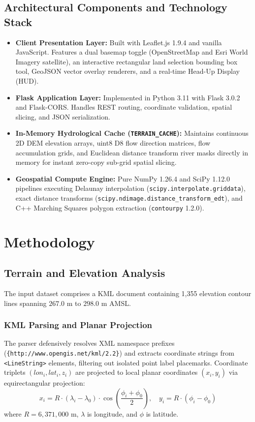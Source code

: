 \documentclass[manuscript,screen,review]{acmart}
\begin{document}
\subsection{Architectural Components and Technology Stack}
\begin{itemize}
    \item \textbf{Client Presentation Layer:} Built with Leaflet.js 1.9.4 and vanilla JavaScript. Features a dual basemap toggle (OpenStreetMap and Esri World Imagery satellite), an interactive rectangular land selection bounding box tool, GeoJSON vector overlay renderers, and a real-time Head-Up Display (HUD).
    \item \textbf{Flask Application Layer:} Implemented in Python 3.11 with Flask 3.0.2 and Flask-CORS. Handles REST routing, coordinate validation, spatial slicing, and JSON serialization.
    \item \textbf{In-Memory Hydrological Cache (\texttt{TERRAIN\_CACHE}):} Maintains continuous 2D DEM elevation arrays, uint8 D8 flow direction matrices, flow accumulation grids, and Euclidean distance transform river masks directly in memory for instant zero-copy sub-grid spatial slicing.
    \item \textbf{Geospatial Compute Engine:} Pure NumPy 1.26.4 and SciPy 1.12.0 pipelines executing Delaunay interpolation (\texttt{scipy.interpolate.griddata}), exact distance transforms (\texttt{scipy.ndimage.distance\_transform\_edt}), and C++ Marching Squares polygon extraction (\texttt{contourpy} 1.2.0).
\end{itemize}

\section{Methodology}
\label{sec:methodology}

\subsection{Terrain and Elevation Analysis}
The input dataset comprises a KML document containing 1,355 elevation contour lines spanning $267.0\text{ m}$ to $298.0\text{ m}$ AMSL.

\subsubsection{KML Parsing and Planar Projection}
The parser defensively resolves XML namespace prefixes (\texttt{\{http://www.opengis.net/kml/2.2\}}) and extracts coordinate strings from \texttt{<LineString>} elements, filtering out isolated point label placemarks. Coordinate triplets $(lon_i, lat_i, z_i)$ are projected to local planar coordinates $(x_i, y_i)$ via equirectangular projection:
\begin{equation}
    x_i = R \cdot (\lambda_i - \lambda_0) \cdot \cos\left(\frac{\phi_i + \phi_0}{2}\right), \quad y_i = R \cdot (\phi_i - \phi_0)
\end{equation}
where $R = 6,371,000\text{ m}$, $\lambda$ is longitude, and $\phi$ is latitude.
\end{document}
